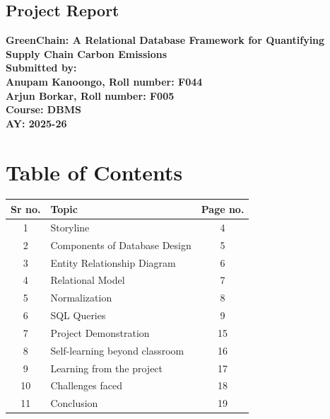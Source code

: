 \documentclass[12pt,a4paper]{article}
\begin{document}
\begin{center}
    \vspace*{2cm}
    \section*{Project Report}
    \vfill
    \textbf{\huge GreenChain: A Relational Database Framework for Quantifying Supply Chain Carbon Emissions} \\
    \vfill
    \textbf{\Large Submitted by:} \\
    \vspace{1cm}
    \textbf{\Large Anupam Kanoongo, Roll number: F044} \\
    \textbf{\Large Arjun Borkar, Roll number: F005} \\
    \vfill
    \textbf{\Large Course: DBMS} \\
    \textbf{\Large AY: 2025-26}
    \vspace*{2cm}
\end{center}

\newpage

\section*{Table of Contents}
\vspace{1cm}
\renewcommand{\arraystretch}{2.2}
\begin{tabularx}{\textwidth}{|c|X|c|}
    \hline
    \textbf{Sr no.} & \textbf{Topic} & \textbf{Page no.} \\ \hline
    1 & Storyline & 4 \\ \hline
    2 & Components of Database Design & 5 \\ \hline
    3 & Entity Relationship Diagram & 6 \\ \hline
    4 & Relational Model & 7 \\ \hline
    5 & Normalization & 8 \\ \hline
    6 & SQL Queries & 9 \\ \hline
    7 & Project Demonstration & 15 \\ \hline
    8 & Self-learning beyond classroom & 16 \\ \hline
    9 & Learning from the project & 17 \\ \hline
    10 & Challenges faced & 18 \\ \hline
    11 & Conclusion & 19 \\ \hline
\end{tabularx}
\end{document}
